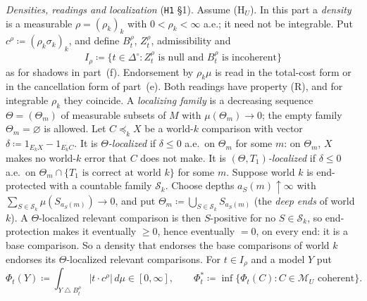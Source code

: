 \documentclass[11pt]{article}
\theoremstyle{definition}
\theoremstyle{remark}
\newcommand{\Di}{\Delta^{\circ}}
\newcommand{\M}{\mathcal M}
\newcommand{\sd}{\mathbin{\triangle}}
\newcommand{\src}[1]{\texttt{#1}}
\begin{document}
\emph{Densities, readings and localization} (\src{H1} \S1). Assume (H$_U$). In this part a \emph{density} is a measurable $\rho=(\rho_k)_k$ with $0<\rho_k<\infty$ a.e.; it need not be integrable. Put $c^\rho\coloneqq(\rho_k\sigma_k)_k$, and define $B^\rho_t$, $Z^\rho_t$, admissibility and
\[
I_\rho\coloneqq\{t\in\Di:Z^\rho_t\text{ is null and }B^\rho_t\text{ is incoherent}\}
\]
as for shadows in part~(f). Endorsement by $\rho_k\mu$ is read in the total-cost form or in the cancellation form of part~(e). Both readings have property (R), and for integrable $\rho_k$ they coincide. A \emph{localizing family} is a decreasing sequence $\Theta=(\Theta_m)$ of measurable subsets of $M$ with $\mu(\Theta_m)\to0$; the empty family $\Theta_m=\varnothing$ is allowed. Let $C\preceq_kX$ be a world-$k$ comparison with vector $\delta\coloneqq1_{E_kX}-1_{E_kC}$. It is \emph{$\Theta$-localized} if $\delta\le0$ a.e.\ on $\Theta_m$ for some $m$: on $\Theta_m$, $X$ makes no world-$k$ error that $C$ does not make. It is \emph{$(\Theta,T_1)$-localized} if $\delta\le0$ a.e.\ on $\Theta_m\cap\{T_1\text{ is correct at world }k\}$ for some $m$. Suppose world $k$ is end-protected with a countable family $\mathcal S_k$. Choose depths $a_S(m)\uparrow\infty$ with $\sum_{S\in\mathcal S_k}\mu(S_{a_S(m)})\to0$, and put $\Theta_m\coloneqq\bigcup_{S\in\mathcal S_k}S_{a_S(m)}$ (the \emph{deep ends} of world $k$). A $\Theta$-localized relevant comparison is then $S$-positive for no $S\in\mathcal S_k$, so end-protection makes it eventually $\ge0$, hence eventually $=0$, on every end: it is a base comparison. So a density that endorses the base comparisons of world $k$ endorses its $\Theta$-localized relevant comparisons. For $t\in I_\rho$ and a model $Y$ put
\[
\Phi_t(Y)\coloneqq\int_{Y\sd B^\rho_t}|t\cdot c^\rho|\,d\mu\in[0,\infty],\qquad\Phi^*_t\coloneqq\inf\{\Phi_t(C):C\in\M_U\text{ coherent}\}.
\]
\end{document}
